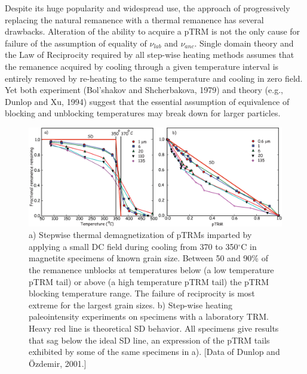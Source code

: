 Despite its huge popularity and widespread use, the  approach of progressively replacing the natural remanence with a thermal remanence has several drawbacks.  Alteration of the ability to acquire a pTRM is not the only cause for failure of the assumption of equality of $\nu_{lab}$ and $\nu_{anc}$.  Single domain theory and the 
Law of Reciprocity required by all step-wise heating methods assumes that the remanence acquired by cooling through a given  temperature interval is entirely removed by re-heating to the same temperature and cooling in zero field.   Yet both  experiment 
(Bol'shakov and Shcherbakova, 1979) \nocite{bolshakov79} and theory 
(e.g., Dunlop and Xu, 1994) \nocite{dunlop94} suggest that the essential assumption of equivalence of blocking and unblocking temperatures may break down for larger particles.   

\begin{figure}[htb]
\centering  \includegraphics[width= 14 cm]{EPSfiles/dunlop01.eps}
\caption{ a) Stepwise thermal demagnetization of pTRMs imparted  by applying a  small DC field during cooling from 370 to 350$^{\circ}$C in magnetite specimens of known grain size.  
Between  50 and 90\% of the remanence unblocks at temperatures below (a low temperature pTRM tail) or above (a high temperature pTRM tail)  the pTRM blocking
temperature range.  The failure of reciprocity  is most extreme for the largest grain sizes.     b) Step-wise heating   paleointensity experiments on specimens with a  laboratory TRM.  Heavy red line is theoretical SD behavior.   All specimens give results that sag below the ideal SD line, an expression of the pTRM tails exhibited by some of the same specimens in a).   [Data of Dunlop and \"Ozdemir, 2001.] }
\label{fig:dunlop01}
\end{figure} \nocite{dunlop01}



